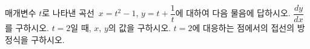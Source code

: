매개변수 $t$로 나타낸 곡선~$x=t^2-1$, $y=t+\dfrac{1}{t}$에 대하여 다음 물음에 답하시오.
 $\dfrac{dy}{dx}$를 구하시오.
 $t=2$일 때, $x$, $y$의 값을 구하시오.
 $t=2$에 대응하는 점에서의 접선의 방정식을 구하시오.
